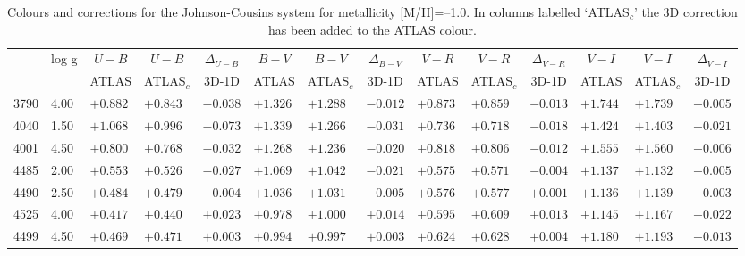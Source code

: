 \documentclass[]{aa}
\def\teff{$T\rm_{eff}$}
\begin{document}
\begin{appendix}
\begin{table*}
\caption{\label{ubvrim10}
Colours and corrections for the Johnson-Cousins system for metallicity [M/H]=--1.0. In columns labelled `ATLAS$_c$' the 3D correction
has been added to the ATLAS colour. }
\renewcommand{\tabcolsep}{3pt}
\tabskip=0pt
\begin{center}
\begin{tabular}{llllllllllllll}
\hline\noalign{\smallskip}
\multicolumn{1}{c}{\teff} & 
\multicolumn{1}{c}{log g} & 
\multicolumn{1}{c}{$U-B$} &
\multicolumn{1}{c}{$U-B$} &
\multicolumn{1}{c}{$\Delta_{U-B}$} &
\multicolumn{1}{c}{$B-V$} &
\multicolumn{1}{c}{$B-V$} &
\multicolumn{1}{c}{$\Delta_{B-V}$} &
\multicolumn{1}{c}{$V-R$} &
\multicolumn{1}{c}{$V-R$} &
\multicolumn{1}{c}{$\Delta_{V-R}$} &
\multicolumn{1}{c}{$V-I$} &
\multicolumn{1}{c}{$V-I$} &
\multicolumn{1}{c}{$\Delta_{V-I}$} \\
\multicolumn{2}{c}{ } &  
\multicolumn{1}{c}{ATLAS} &
\multicolumn{1}{c}{ATLAS$_c$}&
\multicolumn{1}{c}{3D-1D}&
\multicolumn{1}{c}{ATLAS} &
\multicolumn{1}{c}{ATLAS$_c$}&
\multicolumn{1}{c}{3D-1D}&
\multicolumn{1}{c}{ATLAS} &
\multicolumn{1}{c}{ATLAS$_c$}&
\multicolumn{1}{c}{3D-1D}&
\multicolumn{1}{c}{ATLAS} &
\multicolumn{1}{c}{ATLAS$_c$}&
\multicolumn{1}{c}{3D-1D} \\
\hline\noalign{\smallskip}
\hline\noalign{\smallskip}
3790  &4.00 &$ +0.882$ &$ +0.843$ &$ -0.038$ &$ +1.326$ &$ +1.288$ &$ -0.012$ &$ +0.873$ &$ +0.859$ &$ -0.013$ &$ +1.744$ &$ +1.739$ &$ -0.005$\\
4040  &1.50 &$ +1.068$ &$ +0.996$ &$ -0.073$ &$ +1.339$ &$ +1.266$ &$ -0.031$ &$ +0.736$ &$ +0.718$ &$ -0.018$ &$ +1.424$ &$ +1.403$ &$ -0.021$\\
4001  &4.50 &$ +0.800$ &$ +0.768$ &$ -0.032$ &$ +1.268$ &$ +1.236$ &$ -0.020$ &$ +0.818$ &$ +0.806$ &$ -0.012$ &$ +1.555$ &$ +1.560$ &$ +0.006$\\
4485  &2.00 &$ +0.553$ &$ +0.526$ &$ -0.027$ &$ +1.069$ &$ +1.042$ &$ -0.021$ &$ +0.575$ &$ +0.571$ &$ -0.004$ &$ +1.137$ &$ +1.132$ &$ -0.005$\\
4490  &2.50 &$ +0.484$ &$ +0.479$ &$ -0.004$ &$ +1.036$ &$ +1.031$ &$ -0.005$ &$ +0.576$ &$ +0.577$ &$ +0.001$ &$ +1.136$ &$ +1.139$ &$ +0.003$\\
4525  &4.00 &$ +0.417$ &$ +0.440$ &$ +0.023$ &$ +0.978$ &$ +1.000$ &$ +0.014$ &$ +0.595$ &$ +0.609$ &$ +0.013$ &$ +1.145$ &$ +1.167$ &$ +0.022$\\
4499  &4.50 &$ +0.469$ &$ +0.471$ &$ +0.003$ &$ +0.994$ &$ +0.997$ &$ +0.003$ &$ +0.624$ &$ +0.628$ &$ +0.004$ &$ +1.180$ &$ +1.193$ &$ +0.013$\\

\end{tabular}
\end{center}
\end{table*}
\end{appendix}
\end{document}
